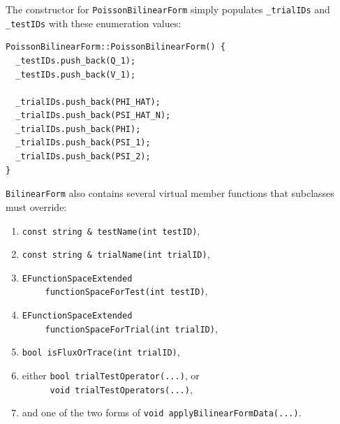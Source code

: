 The constructor for \verb=PoissonBilinearForm= simply populates \verb=_trialIDs= and \verb=_testIDs= with these enumeration values:
\begin{lstlisting}
PoissonBilinearForm::PoissonBilinearForm() {
  _testIDs.push_back(Q_1);
  _testIDs.push_back(V_1);
  
  _trialIDs.push_back(PHI_HAT);
  _trialIDs.push_back(PSI_HAT_N);
  _trialIDs.push_back(PHI);
  _trialIDs.push_back(PSI_1);
  _trialIDs.push_back(PSI_2);
}
\end{lstlisting}

\verb=BilinearForm= also contains several virtual member functions that subclasses must override:
\begin{enumerate}
\item \verb=const string & testName(int testID)=,
\item \verb=const string & trialName(int trialID)=,
\item \verb=EFunctionSpaceExtended=\\ ${ }\qquad$ \verb=functionSpaceForTest(int testID)=,
\item \verb=EFunctionSpaceExtended=\\ ${ }\qquad$ \verb=functionSpaceForTrial(int trialID)=,
\item \verb=bool isFluxOrTrace(int trialID)=,
\item either \verb=bool trialTestOperator(...)=, or\\
      ${ }\mspace{45mu}$ \verb=void trialTestOperators(...)=,
\item and one of the two forms of \verb=void applyBilinearFormData(...)=.
\end{enumerate}

